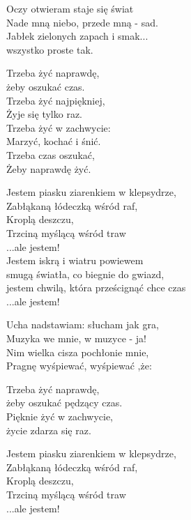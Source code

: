 \begin{text}
    \begin{scriptTwelve}
    Oczy otwieram staje się świat\\
    Nade mną niebo, przede mną - sad.\\
    Jabłek zielonych zapach i smak...\\
    wszystko proste tak.

    Trzeba żyć naprawdę,\\
    żeby oszukać czas.\\
    Trzeba żyć najpiękniej,\\
    Żyje się tylko raz.\\
    Trzeba żyć w zachwycie:\\
    Marzyć, kochać i śnić.\\
    Trzeba czas oszukać,\\
    Żeby naprawdę żyć.

    \vin Jestem piasku ziarenkiem w klepsydrze,\\
    \vin Zabłąkaną łódeczką wśród raf,\\
    \vin Kroplą deszczu,\\
    \vin Trzciną myślącą wśród traw\\
    \vin ...ale jestem!\\
    \vin Jestem iskrą i wiatru powiewem\\
    \vin smugą światła, co biegnie do gwiazd,\\
    \vin jestem chwilą, która prześcignąć chce czas\\
    \vin ...ale jestem!

    Ucha nadstawiam: słucham jak gra,\\
    Muzyka we mnie, w muzyce - ja!\\
    Nim wielka cisza pochłonie mnie,\\
    Pragnę wyśpiewać, wyśpiewać ,że:

    Trzeba żyć naprawdę,\\
    żeby oszukać pędzący czas.\\
    Pięknie żyć w zachwycie,\\
    życie zdarza się raz.

    \vin Jestem piasku ziarenkiem w klepsydrze,\\
    \vin Zabłąkaną łódeczką wśród raf,\\
    \vin Kroplą deszczu,\\
    \vin Trzciną myślącą wśród traw\\
    \vin ...ale jestem!


\end{scriptTwelve}
\end{text}
